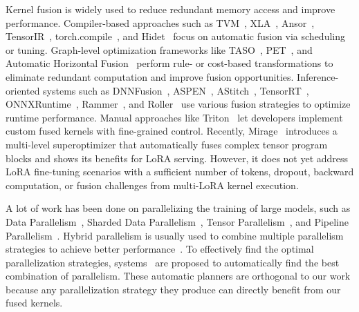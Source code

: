 Kernel fusion is widely used to reduce redundant memory access and improve performance.
Compiler-based approaches such as TVM~\cite{tvm}, XLA~\cite{xla}, Ansor~\cite{zheng2020ansor}, TensorIR~\cite{feng2023tensorir}, torch.compile~\cite{ansel2024pytorch}, and Hidet~\cite{ding2023hidet} focus on automatic fusion via scheduling or tuning. Graph-level optimization frameworks like TASO~\cite{jia2019taso}, PET~\cite{wang2021pet}, and Automatic Horizontal Fusion~\cite{li2022automatic} perform rule- or cost-based transformations to eliminate redundant computation and improve fusion opportunities. Inference-oriented systems such as DNNFusion~\cite{niu2021dnnfusion}, ASPEN~\cite{park2023aspen}, AStitch~\cite{zheng2022astitch}, TensorRT~\cite{tensorrt}, ONNXRuntime~\cite{onnxruntime}, Rammer~\cite{ma2020rammer}, and Roller~\cite{zhu2022roller} use various fusion strategies to optimize runtime performance. Manual approaches like Triton~\cite{tillet2019triton} let developers implement custom fused kernels with fine-grained control.
Recently, Mirage~\cite{wu2024mirage} introduces a multi-level superoptimizer that automatically fuses complex tensor program blocks and shows its benefits for LoRA serving. However, it does not yet address LoRA fine-tuning scenarios with a sufficient number of tokens, dropout, backward computation, or fusion challenges from multi-LoRA kernel execution.


A lot of work has been done on parallelizing the training of large models, such as Data Parallelism~\cite{pytorch-distributed,tensorflow}, Sharded Data Parallelism~\cite{pytorch-fsdp,zero,zero-offload,zero-infinity}, Tensor Parallelism~\cite{megatron-1}, and Pipeline Parallelism~\cite{pipedream,gpipe,dapple}.
Hybrid parallelism is usually used to combine multiple parallelism strategies to achieve better performance~\cite{megatron-1,zheng2022alpa,boehm2014hybrid}.
To effectively find the optimal parallelization strategies, systems~\cite{zheng2022alpa,flexflow,unger2022unity,liu2024aceso,lin2024nnscaler,miao2023galvatron,zhu2025mist} are proposed to automatically find the best combination of parallelism. These automatic planners are orthogonal to our work because any parallelization strategy they produce can directly benefit from our fused kernels.
